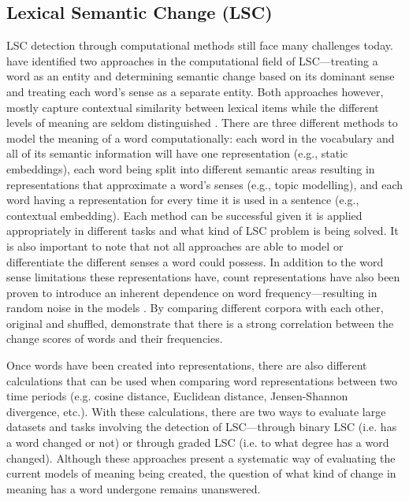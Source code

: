 \subsection{Lexical Semantic Change (LSC)}

LSC detection through computational methods still face many challenges today. \citet{hengchen2021challenges} have identified two approaches in the computational field of LSC—treating a word as an entity and determining semantic change based on its dominant sense and treating each word’s sense as a separate entity. Both approaches however, mostly capture contextual similarity between lexical items while the different levels of meaning are seldom distinguished \citep{hengchen2021challenges}. There are three different methods to model the meaning of a word computationally: each word in the vocabulary and all of its semantic information will have one representation (e.g., static embeddings), each word being split into different semantic areas resulting in representations that approximate a word’s senses (e.g., topic modelling), and each word having a representation for every time it is used in a sentence (e.g., contextual embedding). Each method can be successful given it is applied appropriately in different tasks and what kind of LSC problem is being solved. It is also important to note that not all approaches are able to model or differentiate the different senses a word could possess. In addition to the word sense limitations these representations have, count representations have also been proven to introduce an inherent dependence on word frequency—resulting in random noise in the models \citep{dubossarsky-etal-2017-outta}. By comparing different corpora with each other, original and shuffled, \citet{dubossarsky-etal-2017-outta} demonstrate that there is a strong correlation between the change scores of words and their frequencies. 

Once words have been created into representations, there are also different calculations that can be used when comparing word representations between two time periods (e.g. cosine distance, Euclidean distance, Jensen-Shannon divergence, etc.). With these calculations, there are two ways to evaluate large datasets and tasks involving the detection of LSC—through binary LSC (i.e. has a word changed or not) or through graded LSC (i.e. to what degree has a word changed). Although these approaches present a systematic way of evaluating the current models of meaning being created, the question of what kind of change in meaning has a word undergone remains unanswered.


